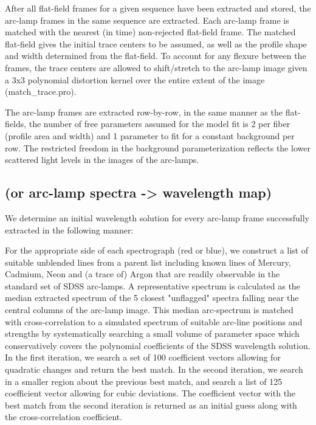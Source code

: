 After all flat-field frames for a given sequence have been extracted
and stored, the arc-lamp frames in the same sequence are extracted.  
Each arc-lamp frame is matched with the nearest (in time) 
non-rejected flat-field frame.  The matched flat-field gives the 
initial trace centers to
be assumed, as well as the profile shape and width determined from the
flat-field.  To account for any flexure between the frames, the trace
centers are allowed to shift/stretch to the arc-lamp image given a 
3x3 polynomial distortion kernel over the entire extent of the image
(match_trace.pro).

The arc-lamp frames are extracted row-by-row, in the same
manner as the flat-fields, the number of free parameters assumed
for the model fit is 2 per fiber (profile area and width) and 1 parameter
to fit for a constant background per row.  The restricted freedom in the
background parameterization reflects the lower scattered light levels in
the images of the arc-lamps.

\subsection{(or arc-lamp spectra -> wavelength map)}

We determine an initial wavelength solution for every arc-lamp frame
successfully extracted in the following manner:

For the appropriate side of each spectrograph (red or blue), we 
construct a list of suitable unblended lines from a parent list including
known lines of Mercury, Cadmium, Neon and (a trace of) Argon 
that are readily observable in the standard set of SDSS arc-lamps. 
A representative spectrum is calculated as the median extracted spectrum
of the 5 closest "unflagged" spectra falling near the central columns 
of the arc-lamp image.  This median arc-spectrum is matched with 
cross-correlation to a simulated spectrum of suitable arc-line positions and 
strengths by systematically searching a small volume of 
parameter space which conservatively covers
the polynomial coefficients of the SDSS wavelength solution.
In the first iteration, we search a set of 
100 coefficient vectors allowing for quadratic changes and return 
the best match.  In the second iteration, we search in a smaller region
about the previous best match, and search a list of 125 coefficient vector
allowing for cubic deviations.  The coefficient vector with the best
match from the second iteration is returned as an initial guess along with
the cross-correlation coefficient.  

